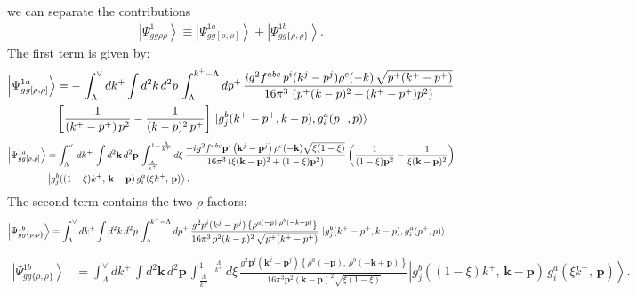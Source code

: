 \documentclass[10pt]{article}
\numberwithin{equation}{section}
\begin{document}
we can separate the contributions
\begin{align}
\left|\Psi_{gg\rho\rho}^{1}\right\rangle \equiv \left|\Psi_{gg[\rho,\rho]}^{1a}\right\rangle + \left|\Psi_{gg\{\rho,\rho\}}^{1b}\right\rangle.
\end{align}
The first term is given by:
\begin{align}
    \left|\Psi_{gg[\rho,\rho]}^{1a}\right\rangle &= -\,\int_{\Lambda}^{\vee} dk^{+} \int d^{2}k\, d^{2}p\, \int_{\Lambda}^{k^{+}-\Lambda}dp^{+}\, \frac{ig^{2}f^{abc}\,p^{i}(k^{j}-p^{j})\rho^{c}(-k)\, \sqrt{p^{+}(k^{+}-p^{+})}}{16\pi^{3}\, \left(p^{+}(k-p)^{2}+(k^{+}-p^{+})p^{2}\right)}\notag \\ &  \left[\frac{1}{(k^{+}-p^{+})\,p^{2}} - \frac{1}{(k-p)^{2}\,p^{+}}\right]\, \ket{g^{b}_{j}(k^{+}-p^{+}, k-p),g^{a}_{i}(p^{+},p)}
\end{align}
\begin{align}\label{part 1}
\left|\Psi_{gg[\rho,\rho]}^{1a}\right\rangle &=\int_{\Lambda}^{\vee}\, dk^{+}\,\int d^{2}\mathbf{k}\, d^{2}\mathbf{p}\,\int_{\frac{\Lambda}{k^{+}}}^{1-\frac{\Lambda}{k^{+}}}d\xi\,\frac{-ig^{2}f^{abc}\mathbf{p}^{i}\left(\mathbf{k}^{j}-\mathbf{p}^{j}\right)\rho^{c}(-\mathbf{k})\sqrt{\xi(1-\xi)}}{16\pi^{3}\left(\xi(\mathbf{k}-\mathbf{p})^{2}+(1-\xi)\mathbf{p}^{2}\right)} \left(\frac{1}{(1-\xi)\mathbf{p}^{2}}-\frac{1}{\xi(\mathbf{k}-\mathbf{p})^{2}}\right)\notag \\ & \left|g_{j}^{b}((1-\xi)k^{+},\,\mathbf{k}-\mathbf{p})\,g_{i}^{a}(\xi k^{+},\,\mathbf{p})\right\rangle.
\end{align}
The second term contains the two $\rho$ factors:
\begin{align}
    \left|\Psi_{gg\{\rho,\rho\}}^{1b}\right\rangle & =  \int_{\Lambda}^{\vee} dk^{+} \int d^{2}k\, d^{2}p\, \int_{\Lambda}^{k^{+}-\Lambda}dp^{+}\, \frac{g^{2}p^{i}(k^{j}-p^{j})\,\{\rho^{a(-p),\rho^{b}(-k+p)}\}}{16\pi^{3}\,p^{2}(k-p)^{2}\, \sqrt{p^{+}(k^{+}-p^{+})}}\, \ket{g^{b}_{j}(k^{+}-p^{+}, k-p),g^{a}_{i}(p^{+},p)}
\end{align}
\begin{align}\label{part 2}
\left|\Psi_{gg\{\rho,\rho\}}^{1b}\right\rangle &= \int_{\Lambda}^{\vee}dk^{+}\,\int d^{2}\mathbf{k}\, d^{2}\mathbf{p}\,\int_{\frac{\Lambda}{k^{+}}}^{1-\frac{\Lambda}{k^{+}}}d\xi\,\frac{g^{2}\mathbf{p}^{i}\left(\mathbf{k}^{j}-\mathbf{p}^{j}\right)\left\{ \rho^{a}(-\mathbf{p}),\,\rho^{b}(-\mathbf{k}+\mathbf{p})\right\} }{16\pi^{3}\mathbf{p}^{2}(\mathbf{k}-\mathbf{p})^{2}\sqrt{\xi(1-\xi)}}  \left|g_{j}^{b}((1-\xi)k^{+},\,\mathbf{k}-\mathbf{p})\,g_{i}^{a}(\xi k^{+},\,\mathbf{p})\right\rangle.
\end{align}
\end{document}
